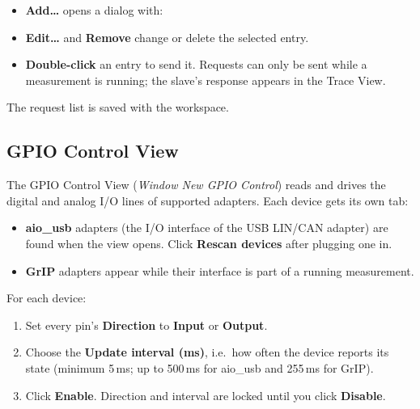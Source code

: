 \documentclass[a4paper,11pt]{article}
\newcommand{\menu}[1]{\textit{#1}}
\newcommand{\ui}[1]{\textbf{#1}}
\begin{document}
\begin{itemize}
  \item \ui{Add\ldots} opens a dialog with:
  \item \ui{Edit\ldots} and \ui{Remove} change or delete the selected entry.
  \item \textbf{Double-click} an entry to send it. Requests can only be sent while
        a measurement is running; the slave's response appears in the Trace View.
\end{itemize}

The request list is saved with the workspace.

\subsection{GPIO Control View}
\label{sec:gpio}

The GPIO Control View (\menu{Window \textrightarrow{} New \textrightarrow{} GPIO Control})
reads and drives the digital and analog I/O lines of supported adapters. Each device
gets its own tab:

\begin{itemize}
  \item \textbf{aio\_usb} adapters (the I/O interface of the USB LIN/CAN adapter) are
        found when the view opens. Click \ui{Rescan devices} after plugging one in.
  \item \textbf{GrIP} adapters appear while their interface is part of a running
        measurement.
\end{itemize}

For each device:

\begin{enumerate}
  \item Set every pin's \ui{Direction} to \ui{Input} or \ui{Output}.
  \item Choose the \ui{Update interval (ms)}, i.e.\ how often the device reports its
        state (minimum 5\,ms; up to 500\,ms for aio\_usb and 255\,ms for GrIP).
  \item Click \ui{Enable}. Direction and interval are locked until you click
        \ui{Disable}.
\end{enumerate}
\end{document}
